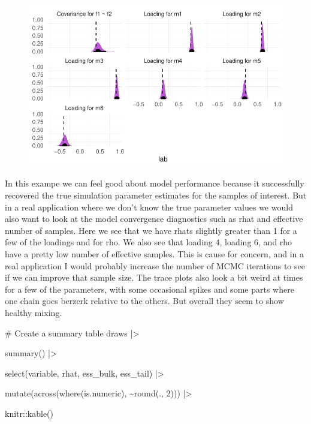 \documentclass[
  letterpaper,
  DIV=11,
  numbers=noendperiod]{scrreprt}
\newenvironment{Shaded}{\begin{snugshade}}{\end{snugshade}}
\newcommand{\CommentTok}[1]{\textcolor[rgb]{0.37,0.37,0.37}{#1}}
\newcommand{\DecValTok}[1]{\textcolor[rgb]{0.68,0.00,0.00}{#1}}
\newcommand{\FunctionTok}[1]{\textcolor[rgb]{0.28,0.35,0.67}{#1}}
\newcommand{\NormalTok}[1]{\textcolor[rgb]{0.00,0.23,0.31}{#1}}
\newcommand{\SpecialCharTok}[1]{\textcolor[rgb]{0.37,0.37,0.37}{#1}}
\begin{document}
\begin{figure}[H]

{\centering \includegraphics{./bayesian-cfa_files/figure-pdf/viz-draws-2-fac-1.pdf}

}

\end{figure}

In this exampe we can feel good about model performance because it
successfully recovered the true simulation parameter estimates for the
samples of interest. But in a real application where we don't know the
true parameter values we would also want to look at the model
convergence diagnostics such as rhat and effective number of samples.
Here we see that we have rhats slightly greater than 1 for a few of the
loadings and for rho. We also see that loading 4, loading 6, and rho
have a pretty low number of effective samples. This is cause for
concern, and in a real application I would probably increase the number
of MCMC iterations to see if we can improve that sample size. The trace
plots also look a bit weird at times for a few of the parameters, with
some occasional spikes and some parts where one chain goes berzerk
relative to the others. But overall they seem to show healthy mixing.

\begin{Shaded}
\begin{Highlighting}[]
\CommentTok{\# Create a summary table}
\NormalTok{draws }\SpecialCharTok{|\textgreater{}}

  \FunctionTok{summary}\NormalTok{() }\SpecialCharTok{|\textgreater{}}

  \FunctionTok{select}\NormalTok{(variable, rhat, ess\_bulk, ess\_tail) }\SpecialCharTok{|\textgreater{}}

  \FunctionTok{mutate}\NormalTok{(}\FunctionTok{across}\NormalTok{(}\FunctionTok{where}\NormalTok{(is.numeric), }\SpecialCharTok{\textasciitilde{}}\FunctionTok{round}\NormalTok{(., }\DecValTok{2}\NormalTok{))) }\SpecialCharTok{|\textgreater{}}

\NormalTok{  knitr}\SpecialCharTok{::}\FunctionTok{kable}\NormalTok{()}
\end{Highlighting}
\end{Shaded}
\end{document}
